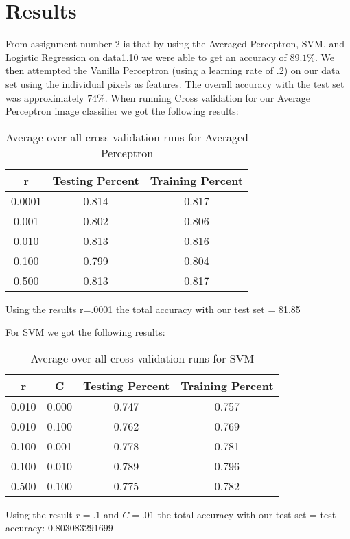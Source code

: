 \documentclass[11pt]{article}
\begin{document}
\section{Results}
From assignment number 2 is that by using the Averaged Perceptron, SVM, and Logistic Regression on data1.10 we were able to get an accuracy of $89.1\%$.  We then attempted the Vanilla Perceptron (using a learning rate of .2) on our data set using the individual pixels as features.  The overall accuracy with the test set was approximately $74\%$.
When running Cross validation for our Average Perceptron image classifier we got the following results:
\begin{table}[h]
  \caption{Average over all cross-validation runs for Averaged Perceptron}
  \label{tbl:avgPerceptronCrossVal}
  \begin{center}
    \begin{tabular}{|c|c|c|}
      \hline
        r    & Testing Percent & Training Percent \\
      \hline
      0.0001 &      0.814      &     0.817        \\
      0.001  &      0.802      &      0.806       \\
      0.010  &      0.813      &      0.816       \\
      0.100  &      0.799      &      0.804       \\
      0.500  &      0.813      &      0.817       \\
      \hline
    \end{tabular}
  \end{center}
\end{table}
Using the results r=.0001 the total accuracy with our test set =   81.85

For SVM we got the following results:
\begin{table}[h]
  \caption{Average over all cross-validation runs for SVM}
  \label{tbl:svmCrossVal}
  \begin{center}
    \begin{tabular}{|c|c|c|c|}
      \hline
        r   &    C   & Testing Percent & Training Percent  \\
      \hline
      0.010 &  0.000 &      0.747      &      0.757        \\
      0.010 &  0.100 &      0.762      &      0.769        \\
      0.100 &  0.001 &      0.778      &      0.781        \\
      0.100 &  0.010 &      0.789      &      0.796        \\
      0.500 &  0.100 &      0.775      &      0.782        \\
      \hline
    \end{tabular}
  \end{center}
\end{table}
Using the result $r=.1$ and $C= .01$ the total accuracy with our test set = test accuracy: $0.803083291699$
\end{document}
